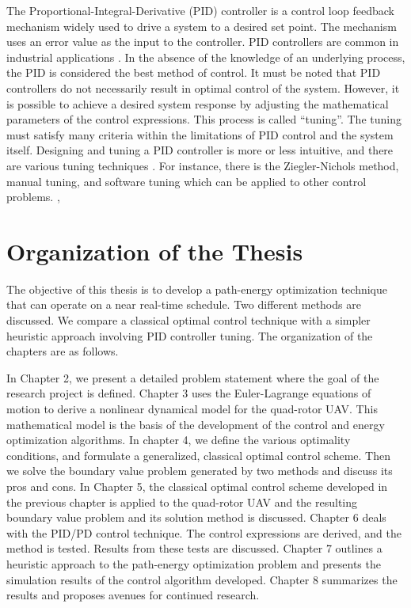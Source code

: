 The Proportional-Integral-Derivative (PID) controller is a control loop feedback mechanism widely used to drive a system to a desired set point. The mechanism uses an error value as the input to the controller. PID controllers are common in industrial applications \cite{o2006reducing}. In the absence of the knowledge of an underlying process, the PID is considered the best method of control. It must be noted that PID controllers do not necessarily result in optimal control of the system. However, it is possible to achieve a desired system response by adjusting the mathematical parameters of the control expressions. This process is called ``tuning''. The tuning must satisfy many criteria within the limitations of PID control and the system itself. Designing and tuning a PID controller is more or less intuitive, and there are various tuning techniques \cite{bequette2003process}. For instance, there is the Ziegler-Nichols method, manual tuning, and software tuning which can be applied to other control problems. \cite{AngChong}, \cite{Bennett}

 




\section{Organization of the Thesis}

The objective of this thesis is to develop a path-energy optimization technique that can operate on a near real-time schedule. Two different methods are discussed. We compare a classical optimal control technique with a simpler heuristic approach involving PID controller tuning. The organization of the chapters are as follows.

In Chapter 2, we present a detailed problem statement where the goal of the research project is defined. Chapter 3 uses the Euler-Lagrange equations of motion to derive a nonlinear dynamical model for the quad-rotor UAV. This mathematical model is the basis of the development of the control and energy optimization algorithms. In chapter 4, we define the various optimality conditions, and formulate a generalized, classical optimal control scheme. Then we solve the boundary value problem generated by two methods and discuss its pros and cons. In Chapter 5, the classical optimal control scheme developed in the previous chapter is applied to the quad-rotor UAV and the resulting boundary value problem and its solution method is discussed. Chapter 6 deals with the PID/PD control technique. The control expressions are derived, and the method is tested. Results from these tests are discussed. Chapter 7 outlines a heuristic approach to the path-energy optimization problem and presents the simulation results of the control algorithm developed. Chapter 8 summarizes the results and proposes avenues for continued research.












